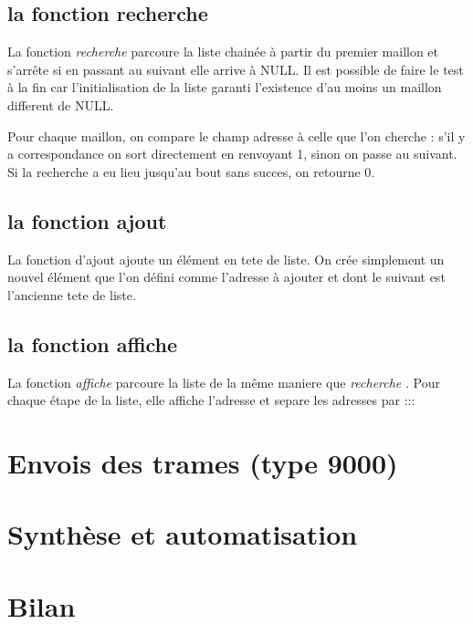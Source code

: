 \documentclass[a4paper,11pt]{article}
\begin{document}
	\subsection{la fonction recherche}
	La fonction \textit{ recherche} parcoure la liste chainée à partir du premier maillon et s'arrête si en passant au suivant elle arrive à NULL. Il est possible de faire le test à la fin car l'initialisation de la liste garanti l'existence d'au moins un maillon different de NULL.

	Pour chaque maillon, on compare le champ adresse à celle que l'on cherche : s'il y a correspondance on sort directement en renvoyant 1, sinon on passe au suivant. Si la recherche a eu lieu jusqu'au bout sans succes, on retourne 0.
	\subsection{la fonction ajout}
	La fonction d'ajout ajoute un élément en tete de liste. On crée simplement un nouvel élément que l'on défini comme l'adresse à ajouter et dont le suivant est l'ancienne tete de liste.
	\subsection{la fonction affiche}
	La fonction  \textit{affiche} parcoure la liste de la même maniere que  \textit{recherche} . Pour chaque étape de la liste, elle affiche l'adresse et separe les adresses par :::
	\section{Envois des trames (type 9000)}
	\section{Synthèse et automatisation}
	\section{Bilan}
\end{document}
